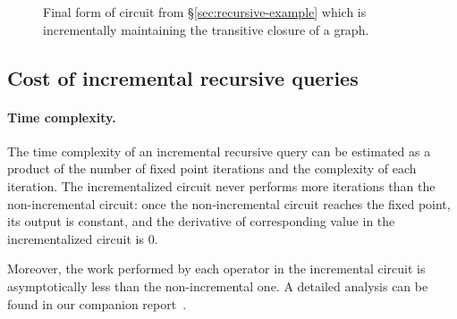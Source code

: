 \documentclass[twocolumn
]{svjour3}
\numberwithin{equation}{section}
\newcommand{\code}[1]{\mbox{\texttt{#1}}}
\newcommand{\zm}{\ensuremath{z^{-1}}} %
\newcommand{\I}{\mathcal{I}}  %
\newcommand{\D}{\mathcal{D}}  %
\newcommand{\I}{\mathit{I}}  %
\newcommand{\D}{\mathit{D}}  %
\newcommand{\secref}[1]{\S\ref{#1}}  %
\newcommand{\refsec}[1]{\secref{#1}}
\newcommand{\lift}[1]{{\uparrow}#1}
\begin{document}
\begin{figure}[h]
\begin{center}
\caption{Final form of circuit from
  \refsec{sec:recursive-example}\label{fig:recursive-example} which is
  incrementally maintaining the transitive closure of a graph.}
  \end{center}
\end{figure}



\subsection{Cost of incremental recursive queries}

\paragraph{Time complexity.}
The time complexity of an incremental recursive query can be estimated
as a product of the number of fixed point iterations and the
complexity of each iteration. The incrementalized circuit never
performs more iterations than the non-incremental circuit: once the
non-incremental circuit reaches the fixed point, its output is
constant, and the derivative of corresponding value in the
incrementalized circuit is 0.

Moreover, the work performed by each operator in the incremental
circuit is asymptotically less than the non-incremental one.  A
detailed analysis can be found in our companion report~\cite{tr}.
\end{document}
